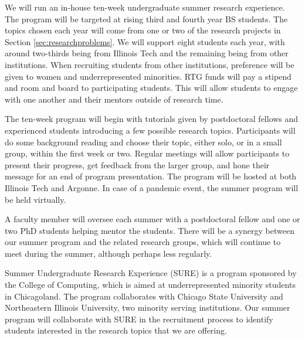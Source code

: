 \documentclass[11pt]{NSFamsart}
\begin{document}
We will run an in-house ten-week undergraduate summer research experience.  The program will be targeted at rising third and fourth year BS students.  The topics chosen each year will come from one or two of the research projects in Section \ref{sec:researchproblems}.  We will support eight students each year, with around two-thirds being from Illinois Tech and the remaining being from other institutions.  When recruiting students from other institutions, preference will be given to women and underrepresented minorities.  RTG funds
will pay a stipend and room and board to participating students.  This will allow students to engage with one another and their mentors outside of research time.  

The ten-week program will begin with tutorials given by postdoctoral fellows and experienced students introducing a few possible research topics.  Participants will do some background reading and choose their topic, either solo, or in a small group, within the first week or two.  Regular meetings will allow participants to present their progress, get feedback from the larger group, and hone their message for an end of program presentation. The program will be hosted at both Illinois Tech and Argonne.  In case of a pandemic event, the summer program will be held virtually.

A faculty member will oversee each summer with a postdoctoral fellow and one or two PhD students helping mentor the students.  There will be a synergy between our summer program and the related research groups, which will continue to meet during the summer, although perhaps less regularly.

Summer Undergraduate Research Experience (SURE) is a program sponsored by the College of Computing, which is aimed at underrepresented minority students in Chicagoland.  The program collaborates with Chicago State University and Northeastern Illinois University, two minority serving institutions.  Our summer program will collaborate with SURE in the recruitment process to identify students interested in the research topics that we are offering.
 
 
\end{document}
